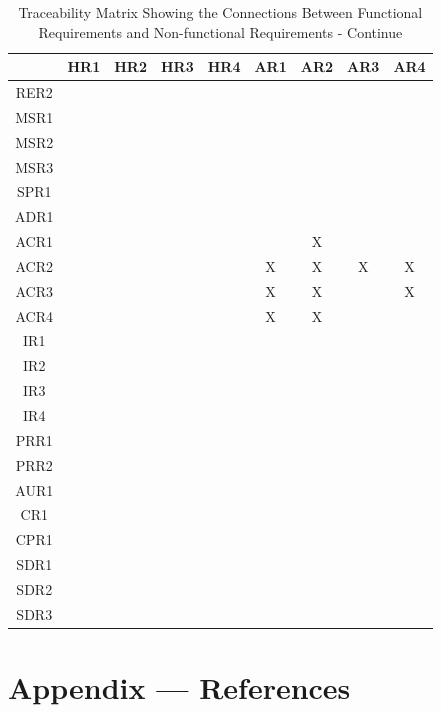 \documentclass[12pt]{article}
\begin{document}
\begin{landscape}
\begin{table}[h!]
\centering
\begin{tabular}{|c|c|c|c|c|c|c|c|c|}
\hline
& HR1 & HR2 & HR3 & HR4 & AR1 & AR2 & AR3 & AR4 \\
\hline
RER2        & & & & & & & & \\ \hline
MSR1        & & & & & & & & \\ \hline
MSR2        & & & & & & & & \\ \hline
MSR3        & & & & & & & & \\ \hline
SPR1        & & & & & & & & \\ \hline
ADR1        & & & & & & & & \\ \hline
ACR1        & & & & & &X & & \\ \hline
ACR2        & & & & &X &X &X &X \\ \hline
ACR3        & & & & &X &X & &X \\ \hline
ACR4        & & & & &X &X & & \\ \hline
IR1         & & & & & & & & \\ \hline
IR2         & & & & & & & & \\ \hline
IR3         & & & & & & & & \\ \hline
IR4         & & & & & & & & \\ \hline
PRR1        & & & & & & & & \\ \hline
PRR2        & & & & & & & & \\ \hline
AUR1        & & & & & & & & \\ \hline
CR1         & & & & & & & & \\ \hline
CPR1        & & & & & & & & \\ \hline
SDR1        & & & & & & & & \\ \hline
SDR2        & & & & & & & & \\ \hline
SDR3        & & & & & & & & \\ \hline
\end{tabular}
\caption{Traceability Matrix Showing the Connections Between Functional Requirements and Non-functional Requirements - Continue}
\label{Table:A_trace}
\end{table}
\end{landscape}

\section*{Appendix --- References}
\end{document}
